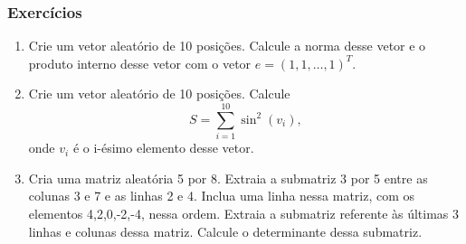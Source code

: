 \documentclass{beamer}
\begin{document}
\begin{frame}[fragile]
\frametitle{Exerc\'icios}

\begin{enumerate}
\item Crie um vetor aleat\'orio de 10 posi\c{c}\~oes. Calcule a norma desse vetor e o produto interno desse vetor com o vetor $e = (1,1,\dots,1)^T$.
\item Crie um vetor aleat\'orio de 10 posi\c{c}\~oes. Calcule $$S = \sum_{i=1}^{10}\sin^2(v_i),$$ onde $v_i$ \'e o i-\'esimo elemento desse vetor.
\item Cria uma matriz aleat\'oria 5 por 8. Extraia a submatriz 3 por 5 entre as colunas 3 e 7 e as linhas 2 e 4. Inclua uma linha nessa matriz, com os elementos 4,2,0,-2,-4, nessa ordem. Extraia a submatriz referente \`as \'ultimas 3 linhas e colunas dessa matriz. Calcule o determinante dessa submatriz.
\end{enumerate}

\end{frame}
\end{document}

